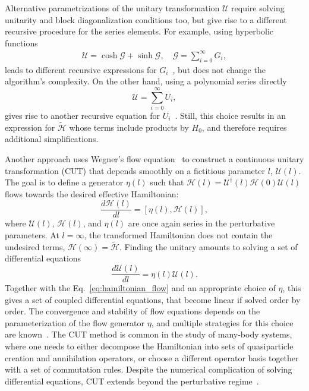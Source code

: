 Alternative parametrizations of the unitary transformation $\mathcal{U}$ require solving unitarity and block diagonalization conditions too, but give rise to a different recursive procedure for the series elements.
For example, using hyperbolic functions
%
\begin{gather}
\mathcal{U} = \cosh{\mathcal{G}} + \sinh{\mathcal{G}}, \quad
\mathcal{G} = \sum_{i=0}^{\infty} G_i,
\end{gather}
%
leads to different recursive expressions for $G_i$~\cite{Shavitt_1980}, but does not change the algorithm's complexity.
On the other hand, using a polynomial series directly
%
\begin{equation}
\mathcal{U} = \sum_{i=0}^{\infty} U_i,
\end{equation}
%
gives rise to another recursive equation for $U_i$~\cite{Van_Vleck_1929, Lowdin_1962, Klein_1974, Suzuki_1983}.
Still, this choice results in an expression for $\tilde{\mathcal{H}}$ whose terms include products by $H_0$, and therefore requires additional simplifications.

Another approach uses Wegner's flow equation~\cite{Wegner_1994,Kehrein_2007} to construct a continuous unitary transformation (CUT) that depends smoothly on a fictitious parameter $l$, $\mathcal{U}(l)$.
The goal is to define a generator $\mathcal{\eta}(l)$ such that $\mathcal{H}(l) = \mathcal{U}^\dagger(l) \mathcal{H}(0) \mathcal{U}(l)$ flows towards the desired effective Hamiltonian:
%
\begin{equation}
\label{eq:hamiltonian_flow}
\frac{d\mathcal{H}(l)}{dl} = [\mathcal{\eta}(l), \mathcal{H}(l)],
\end{equation}
%
where $\mathcal{U}(l)$, $\mathcal{H}(l)$, and $\mathcal{\eta}(l)$ are once again series in the perturbative parameters.
At $l = \infty$, the transformed Hamiltonian does not contain the undesired terms, $\mathcal{H}(\infty) = \tilde{\mathcal{H}}$.
Finding the unitary amounts to solving a set of differential equations
%
\begin{equation}
\frac{d\mathcal{U}(l)}{dl} = \mathcal{\eta}(l)\mathcal{U}(l).
\end{equation}
%
Together with the Eq.~\eqref{eq:hamiltonian_flow} and an appropriate choice of $\mathcal{\eta}$, this gives a set of coupled differential equations, that become linear if solved order by order.
The convergence and stability of flow equations depends on the parameterization of the flow generator $\mathcal{\eta}$, and multiple strategies for this choice are known~\cite{Krull_2012,Savitz_2017}.
The CUT method is common in the study of many-body systems, where one needs to either decompose the Hamiltonian into sets of quasiparticle creation and annihilation operators, or choose a different operator basis together with a set of commutation rules.
Despite the numerical complication of solving differential equations, CUT extends beyond the perturbative regime~\cite{Oitmaa_2006,Kehrein_2007,Krull_2012}.

